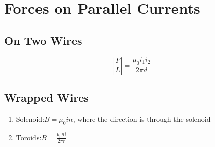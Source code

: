 \documentclass{article}
\begin{document}
\section{Forces on Parallel Currents}

\subsection{On Two Wires} 

$$\left|\frac{F}{L} \right| = \frac{\mu_0 i_1 i_2}{2\pi d}$$

\subsection{Wrapped Wires}

\begin{enumerate}
    \item Solenoid:$B = \mu_0 i n$, where the direction is through the solenoid
    \item Toroids:$B = \frac{\mu_0 n i}{2\pi r}$
\end{enumerate}
\end{document}
